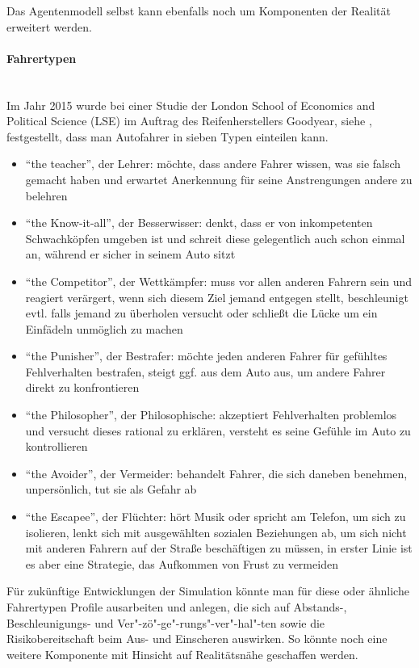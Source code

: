 Das Agentenmodell selbst kann ebenfalls noch um Komponenten der Realität erweitert werden.

\paragraph*{Fahrertypen}
\hfill \\
Im Jahr 2015 wurde bei einer Studie der London School of Economics and Political Science (LSE) im Auftrag des Reifenherstellers Goodyear, siehe \cite{fahrertyp}, festgestellt, dass man Autofahrer in sieben Typen einteilen kann.
\begin{itemize}
\itemsep0em
	\item \enquote{the teacher}, der Lehrer: möchte, dass andere Fahrer wissen, was sie falsch gemacht haben und erwartet Anerkennung für seine Anstrengungen andere zu belehren
	\item \enquote{the Know-it-all}, der Besserwisser: denkt, dass er von inkompetenten Schwachköpfen umgeben ist und schreit diese gelegentlich auch schon einmal an, während er sicher in seinem Auto sitzt
	\item \enquote{the Competitor}, der Wettkämpfer: muss vor allen anderen Fahrern sein und reagiert verärgert, wenn sich diesem Ziel jemand entgegen stellt, beschleunigt evtl. falls jemand zu überholen versucht oder schließt die Lücke um ein Einfädeln unmöglich zu machen
	\item \enquote{the Punisher}, der Bestrafer: möchte jeden anderen Fahrer für gefühltes Fehlverhalten bestrafen, steigt ggf. aus dem Auto aus, um andere Fahrer direkt zu konfrontieren
	\item \enquote{the Philosopher}, der Philosophische: akzeptiert Fehlverhalten problemlos und versucht dieses rational zu erklären, versteht es seine Gefühle im Auto zu kontrollieren
	\item \enquote{the Avoider}, der Vermeider: behandelt Fahrer, die sich daneben benehmen, unpersönlich, tut sie als Gefahr ab
	\item \enquote{the Escapee}, der Flüchter: hört Musik oder spricht am Telefon, um sich zu isolieren, lenkt sich mit ausgewählten sozialen Beziehungen ab, um sich nicht mit anderen Fahrern auf der Straße beschäftigen zu müssen, in erster Linie ist es aber eine Strategie, das Aufkommen von Frust zu vermeiden
\end{itemize}

Für zukünftige Entwicklungen der Simulation könnte man für diese oder ähnliche Fahrertypen Profile ausarbeiten und anlegen, die sich auf Abstands-, Beschleunigungs- und Ver"-zö"-ge"-rungs"-ver"-hal"-ten sowie die Risikobereitschaft beim Aus- und Einscheren auswirken.
So könnte noch eine weitere Komponente mit Hinsicht auf Realitätsnähe geschaffen werden. 


